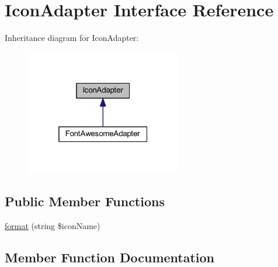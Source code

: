 \hypertarget{interfacehamburgscleanest_1_1_data_tables_1_1_models_1_1_column_formatters_1_1_adapters_1_1_icon_1_1_icon_adapter}{}\section{Icon\+Adapter Interface Reference}
\label{interfacehamburgscleanest_1_1_data_tables_1_1_models_1_1_column_formatters_1_1_adapters_1_1_icon_1_1_icon_adapter}


Inheritance diagram for Icon\+Adapter\+:
\nopagebreak
\begin{figure}[H]
\begin{center}
\leavevmode
\includegraphics[width=193pt]{interfacehamburgscleanest_1_1_data_tables_1_1_models_1_1_column_formatters_1_1_adapters_1_1_iconc27f4a4734b063d9a071eb964632ed97}
\end{center}
\end{figure}
\subsection*{Public Member Functions}
\begin{DoxyCompactItemize}
\item 
\hyperlink{interfacehamburgscleanest_1_1_data_tables_1_1_models_1_1_column_formatters_1_1_adapters_1_1_icon_1_1_icon_adapter_a1d0304fbc3ae752c85fdcea52a87fa03}{format} (string \$icon\+Name)
\end{DoxyCompactItemize}


\subsection{Member Function Documentation}
\mbox{\label{interfacehamburgscleanest_1_1_data_tables_1_1_models_1_1_column_formatters_1_1_adapters_1_1_icon_1_1_icon_adapter_a1d0304fbc3ae752c85fdcea52a87fa03}} 
